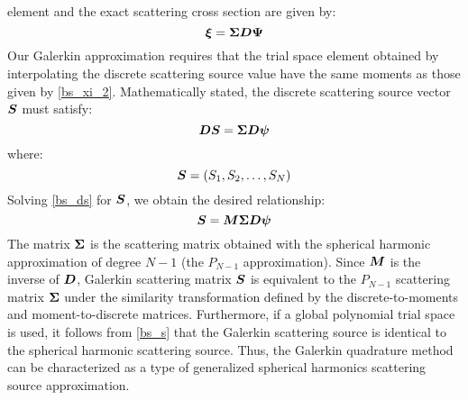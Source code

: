 element and the exact scattering cross section are given by:
\begin{equation}
\bs{\xi} = \bs{\Sigma D\Psi}
\label{bs_xi_2}
\end{equation}
Our Galerkin approximation requires that the trial space element obtained by
interpolating the discrete scattering source value have the same moments as
those given by \cref{bs_xi_2}. Mathematically stated, the discrete
scattering source vector $\boldsymbol{S}$ must satisfy:
\begin{equation}
\bs{DS} = \bs{\Sigma D\psi}
\label{bs_ds}
\end{equation}
where:
\begin{equation}
\boldsymbol{S} = (S_1,S_2,\hdots,S_N)
\end{equation}
Solving \cref{bs_ds} for $\boldsymbol{S}$, we obtain the desired
relationship:
\begin{equation}
\bs{S} = \bs{M\Sigma D\psi}
\label{bs_s}
\end{equation}
The matrix $\boldsymbol{\Sigma}$ is the scattering matrix obtained with the spherical
harmonic approximation of degree $N-1$ (the $P_{N-1}$ approximation). Since
$\boldsymbol{M}$ is the inverse of $\boldsymbol{D}$, Galerkin scattering matrix $\boldsymbol{S}$ is 
equivalent to the $P_{N-1}$ scattering matrix $\boldsymbol{\Sigma}$
under the similarity transformation defined by the discrete-to-moments and
moment-to-discrete matrices. Furthermore, if a global polynomial trial space
is used, it follows from \cref{bs_s} that the Galerkin scattering
source is identical to the spherical harmonic scattering source. Thus, the
Galerkin quadrature method can be characterized as a type of generalized
spherical harmonics scattering source approximation. 

